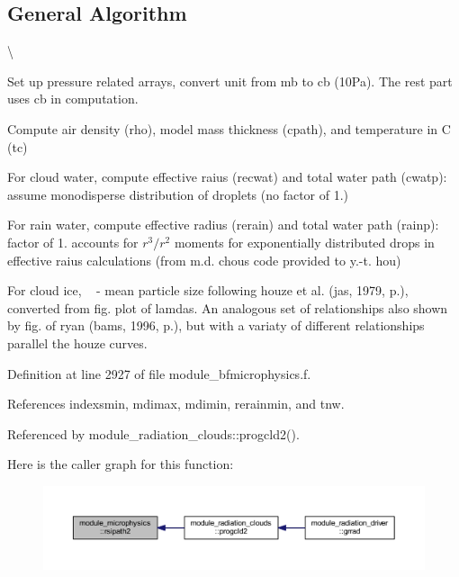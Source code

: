 \hypertarget{namespacemodule__radsw__main_general}{}\subsection{General Algorithm}\label{namespacemodule__radsw__main_general}
\textbackslash{} 
\begin{DoxyEnumerate}
\item Set up pressure related arrays, convert unit from mb to cb (10\+Pa). The rest part uses cb in computation.
\item Compute air density (rho), model mass thickness (cpath), and temperature in C (tc)
\item For cloud water, compute effective raius (recwat) and total water path (cwatp)\+: assume monodisperse distribution of droplets (no factor of 1.)
\item For rain water, compute effective radius (rerain) and total water path (rainp)\+: factor of 1. accounts for $ r^3/r^2 $ moments for exponentially distributed drops in effective raius calculations (from m.\+d. chou\textquotesingle{}s code provided to y.-\/t. hou)
\item For cloud ice, ~\newline
 -\/ mean particle size following houze et al. (jas, 1979, p.), converted from fig. plot of lamdas. An analogous set of relationships also shown by fig. of ryan (bams, 1996, p.), but with a variaty of different relationships parallel the houze curves. 
\end{DoxyEnumerate}

Definition at line 2927 of file module\+\_\+bfmicrophysics.\+f.



References indexsmin, mdimax, mdimin, rerainmin, and tnw.



Referenced by module\+\_\+radiation\+\_\+clouds\+::progcld2().



Here is the caller graph for this function\+:\nopagebreak
\begin{figure}[H]
\begin{center}
\leavevmode
\includegraphics[width=350pt]{namespacemodule__microphysics_ac80bc526194e30c9e1a97e7833a2a77f_icgraph}
\end{center}
\end{figure}




